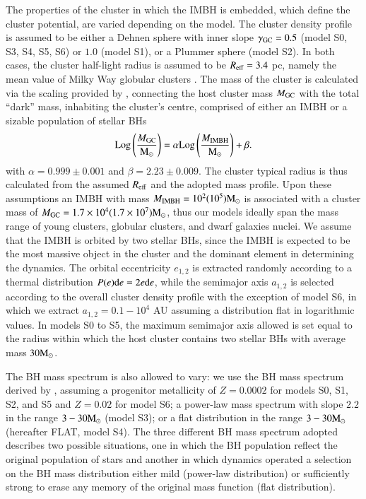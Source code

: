 \documentclass[article]{aa}
\newcommand{\Log}{{\rm Log}}
\newcommand{\Ms}{{\rm M}_\odot}
\newcommand{\gc}{{\rm GC}}
\newcommand{\ibh}{{\rm IMBH}}
\begin{document}
{The properties of the cluster in which the IMBH is embedded, which define the cluster potential, are varied depending on the model. The cluster density profile is assumed to be either a Dehnen sphere with inner slope $\gamma_\gc = 0.5$ (model S0, S3, S4, S5, S6) or $1.0$ (model S1), or a Plummer sphere (model S2). In both cases, the cluster half-light radius is assumed to be $R_{\rm eff} = 3.4$ pc, namely the mean value of Milky Way globular clusters \citep{harris14}. The mass of the cluster is calculated via the scaling provided by \cite{AS16}, connecting the host cluster mass $M_\gc$ with the total ``dark'' mass, inhabiting the cluster's centre, comprised of either an IMBH or a sizable population of stellar BHs
\begin{equation}
\Log \left(\frac{M_\gc}{\Ms}\right) = \alpha \Log \left(\frac{M_\ibh}{\Ms}\right) + \beta.
\label{mcmibh}
\end{equation}
with $\alpha = 0.999 \pm 0.001$ and $\beta = 2.23 \pm 0.009$. The cluster typical radius is thus calculated from the assumed $R_{\rm eff}$ and the adopted mass profile. Upon these assumptions an IMBH with mass $M_\ibh = 10^2(10^5)\Ms$ is associated with a cluster mass of $ M_\gc = 1.7\times 10^4(1.7\times 10^7)\Ms$, thus our models ideally span the mass range of young clusters, globular clusters, and dwarf galaxies nuclei. We assume that the IMBH is orbited by two stellar BHs, since the IMBH is expected to be the most massive object in the cluster and the dominant element in determining the dynamics. The orbital eccentricity $e_{1,2}$ is extracted randomly according to a thermal distribution $P(e){\rm d} e = 2e{\rm d}e$, while the semimajor axis $a_{1,2}$ is selected according to the overall cluster density profile with the exception of model S6, in which we extract $a_{1,2} = 0.1-10^4$ AU assuming a distribution flat in logarithmic values.  
In models S0 to S5, the maximum semimajor axis allowed is set equal to the radius within which the host cluster contains two stellar BHs with average mass $30\Ms$. 

The BH mass spectrum is also allowed to vary: we use the BH mass spectrum derived by \citep[SM17][]{spera17}, assuming a progenitor metallicity of $Z = 0.0002$ for models S0, S1, S2, and S5 and $Z = 0.02$ for model S6; a power-law mass spectrum with slope $2.2$ \citep[O16][]{oleary16} in the range $3-30 \Ms$ (model S3); or a flat distribution in the range $3-30 \Ms$ (hereafter FLAT, model S4). The three different BH mass spectrum adopted describes two possible situations, one in which the BH population reflect the original population of stars and another in which dynamics operated a selection on the BH mass distribution either mild (power-law distribution) or sufficiently strong to erase any memory of the original mass function (flat distribution). 
}
\end{document}
